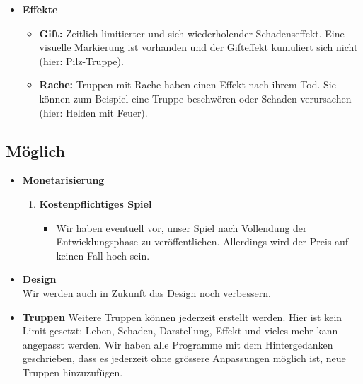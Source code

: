 \begin{itemize}
    \item \textbf{Effekte}
    \begin{itemize}
        \item \textbf{Gift:}
        Zeitlich limitierter und sich wiederholender Schadenseffekt.
        Eine visuelle Markierung ist vorhanden und der Gifteffekt kumuliert sich nicht (hier: Pilz-Truppe).
        \item \textbf{Rache:}
            Truppen mit Rache haben einen Effekt nach ihrem Tod. Sie können zum Beispiel eine Truppe beschwören oder Schaden verursachen (hier: Helden mit Feuer).
    \end{itemize}
\end{itemize}

\subsection{Möglich}
\begin{itemize}
    \item \textbf{Monetarisierung} \\
    \begin{enumerate}
        \item \textbf{Kostenpflichtiges Spiel}
        \begin{itemize}
            \item Wir haben eventuell vor, unser Spiel nach Vollendung der Entwicklungsphase zu veröffentlichen. Allerdings wird der Preis auf keinen Fall hoch sein.
        \end{itemize}
    \end{enumerate}
    \item \textbf{Design} \\
        Wir werden auch in Zukunft das Design noch verbessern. 
    \item \textbf{Truppen}
        Weitere Truppen können jederzeit erstellt werden. Hier ist kein Limit gesetzt: Leben, Schaden, Darstellung, Effekt und vieles mehr kann angepasst werden. 
        Wir haben alle Programme mit dem Hintergedanken geschrieben, dass es jederzeit ohne grössere Anpassungen möglich ist, neue Truppen hinzuzufügen.
    
\end{itemize}


